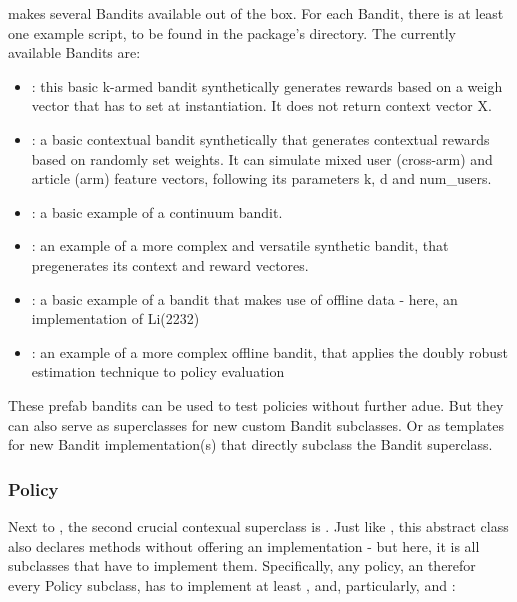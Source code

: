 \documentclass[nojss]{jss}\usepackage[]{graphicx}\usepackage[]{color}
\begin{document}
 makes several Bandits available out of the box. For each Bandit, there is at least one example script, to be found in the package's   directory. The currently available Bandits are:

\begin{itemize}
         \item {}: this basic k-armed bandit synthetically generates rewards based on a weigh vector that has to set at instantiation. It does not return context vector X.
         \item {}: a basic contextual bandit synthetically that generates contextual rewards based on randomly set weights. It can simulate mixed user (cross-arm) and article (arm) feature vectors, following its parameters k, d and num\_users.
         \item {}: a basic example of a continuum bandit.
         \item {}: an example of a more complex and versatile synthetic bandit, that pregenerates its context and reward vectores.
         \item {}: a basic example of a bandit that makes use of offline data - here, an implementation of Li(2232)
         \item {}: an example of a more complex offline bandit, that applies the doubly robust estimation technique to policy evaluation
\end{itemize}

These prefab bandits can be used to test policies without further adue. But they can also serve as superclasses for new custom Bandit subclasses. Or as templates for new Bandit implementation(s) that directly subclass the Bandit superclass.

\subsubsection{Policy}

Next to , the second crucial contexual superclass is . Just like , this abstract class also declares methods without offering an implementation - but here, it is all  subclasses that have to implement them. Specifically, any policy, an therefor every Policy subclass, has to implement at least , and, particularly,  and :
\end{document}
